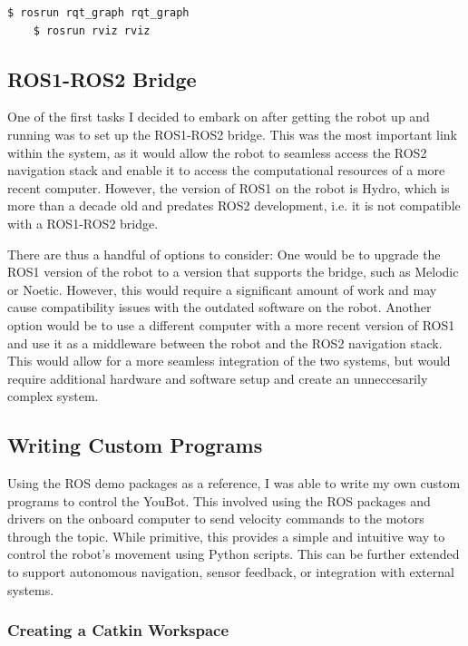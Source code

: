 \documentclass[a4paper, 12pt]{article}
\newcommand{\code}[1]{\texttt{\detokenize{#1}}}
\begin{document}
    \begin{lstlisting}[style=plain]
    $ rosrun rqt_graph rqt_graph
    $ rosrun rviz rviz
    \end{lstlisting}

    \pagebreak
    \subsection{ROS1-ROS2 Bridge}

    One of the first tasks I decided to embark on after getting the robot up and running was to set up the ROS1-ROS2 bridge. This was the most important link within the system, as it would allow the robot to seamless access the ROS2 navigation stack and enable it to access the computational resources of a more recent computer. However, the version of ROS1 on the robot is Hydro, which is more than a decade old and predates ROS2 development, i.e. it is not compatible with a ROS1-ROS2 bridge. 

    There are thus a handful of options to consider: One would be to upgrade the ROS1 version of the robot to a version that supports the bridge, such as Melodic or Noetic. However, this would require a significant amount of work and may cause compatibility issues with the outdated software on the robot. Another option would be to use a different computer with a more recent version of ROS1 and use it as a middleware between the robot and the ROS2 navigation stack. This would allow for a more seamless integration of the two systems, but would require additional hardware and software setup and create an unneccesarily complex system. 

    \pagebreak

    \subsection{Writing Custom Programs}

    Using the ROS demo packages as a reference, I was able to write my own custom programs to control the YouBot. This involved using the ROS packages and drivers on the onboard computer to send velocity commands to the motors through the \code{/cmd_vel} topic. While primitive, this provides a simple and intuitive way to control the robot's movement using Python scripts. This can be further extended to support autonomous navigation, sensor feedback, or integration with external systems.

    \subsubsection{Creating a Catkin Workspace}
\end{document}
